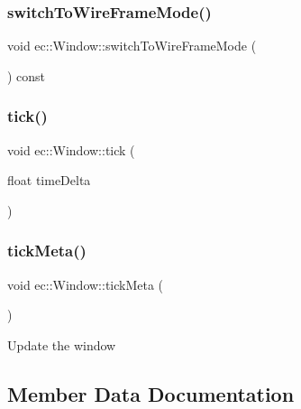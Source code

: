 \subsubsection{\texorpdfstring{switch\+To\+Wire\+Frame\+Mode()}{switchToWireFrameMode()}}
{\footnotesize\ttfamily void ec\+::\+Window\+::switch\+To\+Wire\+Frame\+Mode (\begin{DoxyParamCaption}{ }\end{DoxyParamCaption}) const}

\mbox{\label{classec_1_1_window_a093b4989e4cd12cf9e62777ec4ef8661}} 
\subsubsection{\texorpdfstring{tick()}{tick()}}
{\footnotesize\ttfamily void ec\+::\+Window\+::tick (\begin{DoxyParamCaption}\item[{float}]{time\+Delta }\end{DoxyParamCaption})\hspace{0.3cm}{\ttfamily [virtual]}}

\mbox{\label{classec_1_1_window_a0adaafc13d0dafc238aa0aaa0f5f4f82}} 
\subsubsection{\texorpdfstring{tick\+Meta()}{tickMeta()}}
{\footnotesize\ttfamily void ec\+::\+Window\+::tick\+Meta (\begin{DoxyParamCaption}{ }\end{DoxyParamCaption})}

Update the window 

\subsection{Member Data Documentation}
\mbox{\label{classec_1_1_window_a1c72dfdc44a79fe7d70456258db7064c}} 
